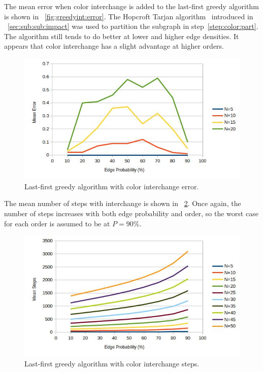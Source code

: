 The mean error when color interchange is added to the last-first greedy algorithm is shown in
\figurename~\ref{fig:greedyint:error}.  The Hopcroft Tarjan algorithm~\cite{hopcroft} introduced in
\sectionname~\ref{sec:sub:sub:impact} was used to partition the subgraph in step~\ref{step:color:part}.  The
algorithm still tends to do better at lower and higher edge densities.  It appears that color interchange has a
slight advantage at higher orders.

\begin{figure}[H]
  \centering
  \includegraphics[width=5in]{greedyint_error}
  \caption{Last-first greedy algorithm with color interchange error.}
  \label{fig:greedy:error}
\end{figure}

The mean number of steps with interchange is shown in \figurename~\ref{fig:greedyint:steps}.  Once again, the
number of steps increases with both edge probability and order, so the worst case for each order is assumed to be
at \(P=90\%\).

\begin{figure}[H]
  \centering
  \includegraphics[width=5in]{greedyint_steps}
  \caption{Last-first greedy algorithm with color interchange steps.}
  \label{fig:greedyint:steps}
\end{figure}

